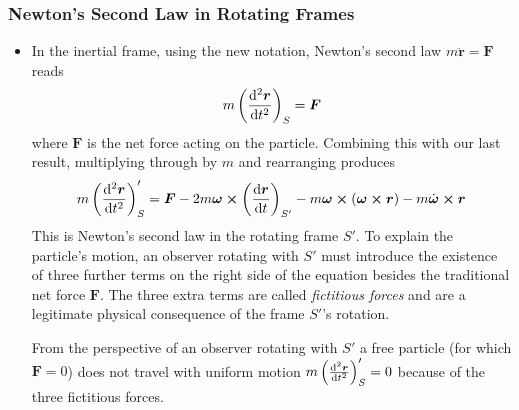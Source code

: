 \documentclass[11pt, a4paper]{article}
\newcommand{\bdot}[1]{\dot{\bm{#1}}}
\newcommand{\bddot}[1]{\ddot{\bm{#1}}}
\begin{document}
\subsubsection{Newton's Second Law in Rotating Frames}
\begin{itemize}
	\item In the inertial frame, using the new notation, Newton's second law $ m \bddot{r} = \bm{F} $ reads
	\begin{equation*}
		m \left(\dv[2]{\bm{r}}{t}\right)_{S} = \bm{F}
	\end{equation*}
	where $ \bm{F} $ is the net force acting on the particle. Combining this with our last result, multiplying through by $ m $ and rearranging produces
	\begin{equation*}
		m\left(\dv[2]{\bm{r}}{t}\right)_{S}' = \bm{F} - 2m\bm{\omega} \cross  \left(\dv{\bm{r}}{t}\right)_{S'}  - m\bm{\omega} \cross (\bm{\omega} \cross \bm{r}) - m\bdot{\omega} \cross \bm{r}
	\end{equation*}
	This is Newton's second law in the rotating frame $ S' $. To explain the particle's motion, an observer rotating with $ S' $ must introduce the existence of three further terms on the right side of the equation besides the traditional net force $ \bm{F} $. The three extra terms are called \textit{fictitious forces} and are a legitimate physical consequence of the frame $ S' $'s rotation.
	
	From the perspective of an observer rotating with $ S' $ a free particle (for which $ \bm{F} = 0 $) does not travel with uniform motion $ m\left(\dv[2]{\bm{r}}{t}\right)_{S}' = 0 $ because of the three fictitious forces.

\end{itemize}
\end{document}
